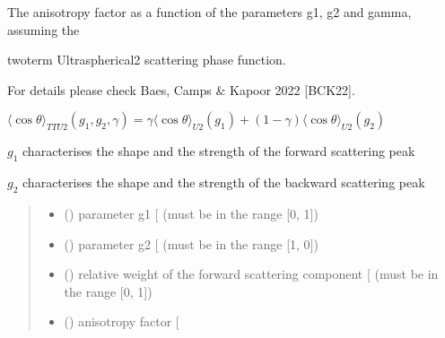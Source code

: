 \documentclass[letterpaper,10pt,english]{sphinxmanual}
\begin{document}
\begin{fulllineitems}
\label{\detokenize{06_anisotropy_factor:skinoptics.anisotropy_factor.costheta_TTU2}}
\pysigstartsignatures
{}
\pysigstopsignatures
\begin{DUlineblock}{0em}
\item[] The anisotropy factor as a function of the parameters g1, g2 and gamma, assuming the
\item[] two\sphinxhyphen{}term Ultraspherical\sphinxhyphen{}2 scattering phase function.
\item[] For details please check Baes, Camps \& Kapoor 2022 {[}BCK22{]}.
\end{DUlineblock}

\sphinxAtStartPar
\(\langle \cos\theta \rangle_{TTU2}(g_1, g_2, \gamma) = \gamma \langle \cos\theta \rangle_{U2}(g_1) + (1 - \gamma) \langle \cos\theta \rangle_{U2}(g_2)\)

\sphinxAtStartPar
\(g_1\) characterises the shape and the strength of the forward scattering peak

\sphinxAtStartPar
\(g_2\) characterises the shape and the strength of the backward scattering peak
\begin{quote}\begin{description}
\begin{itemize}
\item {} 
\sphinxAtStartPar
{} () \textendash{} parameter g1 {[}\sphinxhyphen{}{]} (must be in the range {[}0, 1{]})

\item {} 
\sphinxAtStartPar
{} () \textendash{} parameter g2 {[}\sphinxhyphen{}{]} (must be in the range {[}\sphinxhyphen{}1, 0{]})

\item {} 
\sphinxAtStartPar
{} () \textendash{} relative weight of the forward scattering component {[}\sphinxhyphen{}{]} (must be in the range {[}0, 1{]})

\end{itemize}

\sphinxAtStartPar
\begin{itemize}
\item {} 
\sphinxAtStartPar
{} () \textendash{} anisotropy factor {[}\sphinxhyphen{}{]}

\end{itemize}


\end{description}\end{quote}

\end{fulllineitems}
\end{document}

